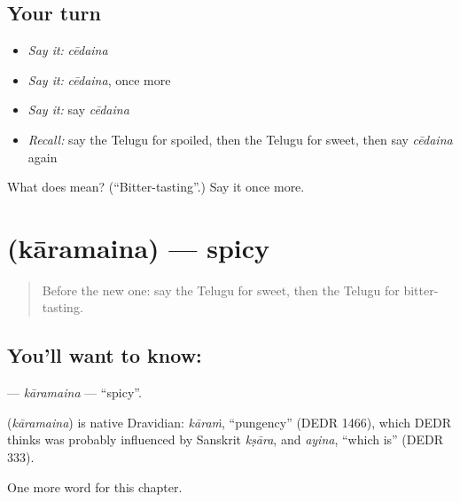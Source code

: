 \subsection*{Your turn}
\begin{itemize}
\raggedright
  \item \emph{Say it:} \emph{cēdaina}
  \item \emph{Say it:} \emph{cēdaina}, once more
  \item \emph{Say it:} say \emph{cēdaina}
  \item \emph{Recall:} say the Telugu for spoiled, then the Telugu for sweet, then say \emph{cēdaina} again
\end{itemize}

\begin{tcolorbox}[breakable,colback=teal!4,colframe=teal!35!black,title={Before you move on}]
What does  mean? (\textquotedblleft{}Bitter-tasting\textquotedblright{}.) Say it once more.
\end{tcolorbox}
\section[\texorpdfstring{\te{కారమైన} (kāramaina)}{కారమైన (kāramaina)}]{ (kāramaina) — spicy}

\label{lesson:TE-C141-karamaina}



\begin{quote}
Before the new one: say the Telugu for sweet, then the Telugu for bitter-tasting.
\end{quote}

\subsection*{You'll want to know: }
\textbf{} — \emph{kāramaina} — \textquotedblleft{}spicy\textquotedblright{}.

\begin{cousinweb}
\textbf{} (\emph{kāramaina}) is native Dravidian: \emph{kāraṁ}, \textquotedblleft{}pungency\textquotedblright{} (DEDR 1466), which DEDR thinks was probably influenced by Sanskrit \emph{kṣāra}, and \emph{ayina}, \textquotedblleft{}which is\textquotedblright{} (DEDR 333).
\end{cousinweb}

\begin{grammarlens}[title={What you've built}]
One more word for this chapter.
\end{grammarlens}

